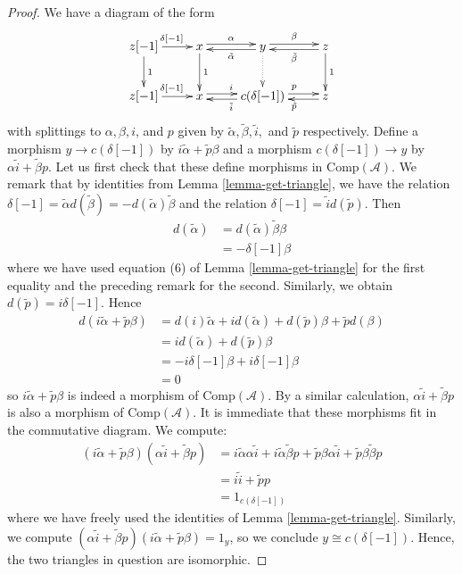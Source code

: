 \begin{proof}
We have a diagram of the form
$$
\xymatrix{
z[-1]\ar[r]^{\delta[-1]}\ar[d]^1 &
x\ar@<0.5ex>[r]^{\alpha}\ar[d]^1 &
y\ar@<0.5ex>[r]^{\beta}\ar@{.>}[d]\ar@<0.5ex>[l]^{\tilde{\alpha}} &
z\ar[d]^1\ar@<0.5ex>[l]^{\tilde\beta} \\
z[-1] \ar[r]^{\delta[-1]} &
x\ar@<0.5ex>[r]^i &
c(\delta[-1]) \ar@<0.5ex>[r]^p\ar@<0.5ex>[l]^{\tilde i} &
z\ar@<0.5ex>[l]^{\tilde p}
}
$$
with splittings to $\alpha, \beta, i$, and $p$ given by
$\tilde{\alpha}, \tilde{\beta}, \tilde{i},$ and $\tilde{p}$ respectively.
Define a morphism $y \to c(\delta[-1])$ by
$i\tilde{\alpha} + \tilde{p}\beta$ and a morphism
$c(\delta[-1]) \to y$ by $\alpha \tilde{i} + \tilde{\beta} p$.
Let us first check that these define morphisms in $\text{Comp}(\mathcal{A})$.
We remark that by identities from Lemma \ref{lemma-get-triangle},
we have the relation
$\delta[-1] = \tilde{\alpha}d(\tilde{\beta}) = -d(\tilde{\alpha})\tilde{\beta}$
and the relation $\delta[-1] = \tilde{i}d(\tilde{p})$. Then
\begin{align*}
d(\tilde{\alpha})
& =
d(\tilde{\alpha})\tilde{\beta}\beta \\
& =
-\delta[-1]\beta
\end{align*}
where we have used equation (6) of
Lemma \ref{lemma-get-triangle} for the first equality and
the preceding remark for the second. Similarly, we obtain
$d(\tilde{p}) = i\delta[-1]$. Hence
\begin{align*}
d(i\tilde{\alpha} + \tilde{p}\beta)
& =
d(i)\tilde{\alpha} + id(\tilde{\alpha}) +
d(\tilde{p})\beta + \tilde{p}d(\beta) \\
& =
id(\tilde{\alpha}) + d(\tilde{p})\beta \\
& =
-i\delta[-1]\beta + i\delta[-1]\beta \\
& =
0
\end{align*}
so $i\tilde{\alpha} + \tilde{p}\beta$ is indeed a morphism of
$\text{Comp}(\mathcal{A})$. By a similar calculation,
$\alpha \tilde{i} + \tilde{\beta} p$ is also a morphism of
$\text{Comp}(\mathcal{A})$. It is immediate that these morphisms
fit in the commutative diagram. We compute:
\begin{align*}
(i\tilde{\alpha} + \tilde{p}\beta)(\alpha \tilde{i} + \tilde{\beta} p)
& =
i\tilde{\alpha}\alpha\tilde{i} + i\tilde{\alpha}\tilde{\beta}p
+ \tilde{p}\beta\alpha\tilde{i} + \tilde{p}\beta\tilde{\beta}p \\
& =
i\tilde{i} + \tilde{p}p \\
& =
1_{c(\delta[-1])}
\end{align*}
where we have freely used the identities of
Lemma \ref{lemma-get-triangle}. Similarly, we compute
$(\alpha \tilde{i} + \tilde{\beta} p)(i\tilde{\alpha} + \tilde{p}\beta) = 1_y$,
so we conclude $y \cong c(\delta[-1])$. Hence, the two triangles in question
are isomorphic.
\end{proof}

